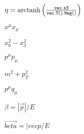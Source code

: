 \documentclass{article}
\begin{document}
$ \eta = \text{arctanh}\left(\frac{\tt vec.x3}{\tt vec.T().Mag()}\right) $
\pagebreak

$ x^\mu x_\mu $
\pagebreak

$ x_0^2-x_3^2 $
\pagebreak

$ p^\mu p_\mu $
\pagebreak

$ m^2 + p_T^2 $
\pagebreak

$ p^\mu q_\mu $
\pagebreak

$ \beta = |\vec{p}|/E $
\pagebreak

$ \vec{beta} = |vec{p}/E $
\pagebreak
\end{document}
